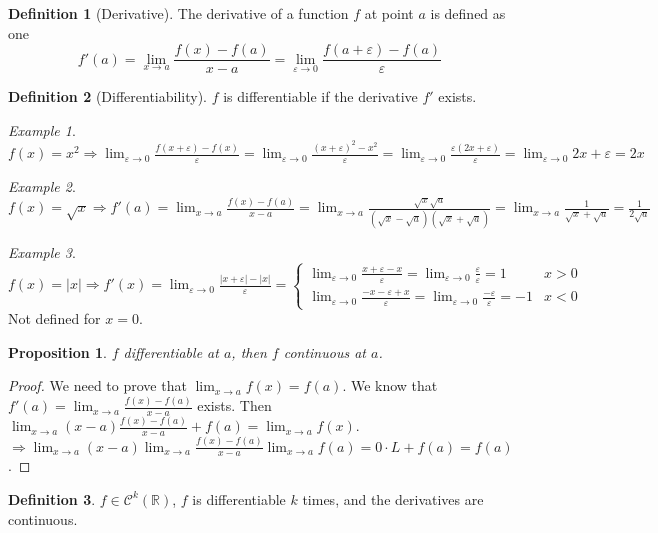 \documentclass{article}
\newcommand{\DS}{\displaystyle}
\newcommand{\Ar}{\Rightarrow}
\newcommand{\lime}{\lim_{\varepsilon \to 0}}
\newcommand{\limx}[1]{\lim_{x \to #1}}
\theoremstyle{definition}
\newtheorem{definition}{Definition}[section]
\theoremstyle{definition}
\theoremstyle{plain}
\theoremstyle{plain}
\theoremstyle{plain}
\theoremstyle{plain}
\newtheorem{proposition}[theorem]{Proposition}
\theoremstyle{definition}
\theoremstyle{remark}
\newtheorem{exampled}{Example}[definition]
\theoremstyle{remark}
\theoremstyle{remark}
\theoremstyle{remark}
\newcommand{\R}{\mathbb{R}}
\newcommand{\E}{\varepsilon}
\begin{document}
\begin{definition}[Derivative]
  The derivative of a function $f$ at point $a$ is defined as one
  \[
  f'(a) = \limx{a} \frac{f(x)-f(a)}{x-a} = \lime \frac{f(a+\E)-f(a)}{\E}
  \]
\end{definition}


\begin{definition}[Differentiability]
  $f$ is differentiable if the derivative $f'$ exists.
\end{definition}

\begin{exampled}
  $\DS f(x) = x^2 \Ar \lime \frac{f(x+\E)-f(x)}{\E} = \lime \frac{(x+\E)^2 - x^2}{\E} = \lime \frac{\E (2x + \E)}{\E} = \lime 2x + \E = 2x$
\end{exampled}

\begin{exampled}
  $\DS f(x) = \sqrt{x} \Ar f'(a) = \limx{a} \frac{f(x)-f(a)}{x-a} = \limx{a} \frac{\sqrt{x} \sqrt{a}}{(\sqrt{x}-\sqrt{a})(\sqrt{x}+\sqrt{a})} = \limx{a} \frac{1}{\sqrt{x}+\sqrt{a}} = \frac{1}{2\sqrt{a}}$
\end{exampled}

\begin{exampled}
  $\DS f(x) = |x| \Ar f'(x) = \lime \frac{|x+\E| - |x|}{\E} =
    \begin{cases}
      \lime \frac{x + \E - x}{\E} = \lime \frac{\E}{\E} = 1 & x > 0 \\
      \lime \frac{-x - \E + x}{\E} = \lime \frac{-\E}{\E} = -1 & x < 0
    \end{cases}$
  \\Not defined for $x = 0$.
\end{exampled}


\begin{proposition}
  $f$ differentiable at $a$, then $f$ continuous at $a$.
\end{proposition}

\begin{proof}
  We need to prove that $\DS \limx{a} f(x) = f(a)$. We know that $f'(a) = \limx{a} \frac{f(x)-f(a)}{x-a}$ exists. Then $\DS \limx{a} (x-a) \frac{f(x)-f(a)}{x-a} + f(a) = \limx{a} f(x)$. $\DS \Ar \limx{a}(x-a) \limx{a} \frac{f(x)-f(a)}{x-a} \limx{a}f(a) = 0 \cdot L + f(a) = f(a)$.
\end{proof}


\begin{definition}
  $f \in \mathcal{C}^k(\R)$, $f$ is differentiable $k$ times, and the derivatives are continuous.
\end{definition}
\end{document}
